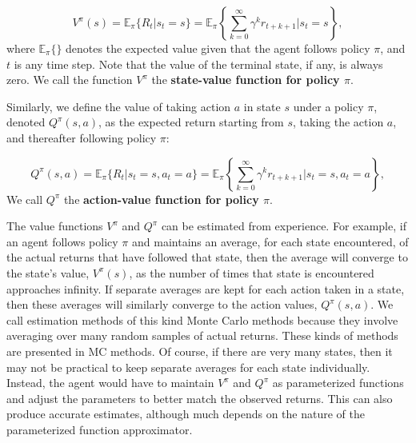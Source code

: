 \begin{equation}\label{rl-policy-state-value}
V^\pi(s) = \mathbb{E}_\pi\{R_t|s_t = s\} = 
\mathbb{E}_\pi\left\{ \sum_{k=0}^\infty\gamma^k r_{t+k+1} | s_t = s \right\},
\end{equation}
where $\mathbb{E}_\pi\{ \}$ denotes the expected value given that the agent follows 
policy $\pi$, and $t$ is any time step. Note that the value of the terminal state, if 
any, is always zero. We call the function $V^\pi$ the {\bf state-value function for 
policy $\pi$}.

Similarly, we define the value of taking action $a$ in state $s$ under a policy $\pi$, 
denoted $Q^\pi(s,a)$, as the expected return starting from $s$, taking the action $a$, 
and thereafter following policy $\pi$:

\begin{equation}\label{rl-policy-action-value}
Q^\pi(s, a) = \mathbb{E}_\pi\{R_t|s_t = s, a_t = a\} = 
\mathbb{E}_\pi\left\{ \sum_{k=0}^\infty\gamma^k r_{t+k+1} | s_t = s, a_t = a \right\},
\end{equation}
We call $Q^\pi$ the {\bf action-value function for policy $\pi$}.

The value functions $V^\pi$ and $Q^\pi$ can be estimated from experience. For example, 
if an agent follows policy $\pi$ and maintains an average, for each state encountered, 
of the actual returns that have followed that state, then the average will converge to 
the state's value, $V^\pi(s)$, as the number of times that state is encountered 
approaches infinity. If separate averages are kept for each action taken in a state, 
then these averages will similarly converge to the action values, $Q^\pi(s,a)$. We call 
estimation methods of this kind Monte Carlo methods because they involve averaging over 
many random samples of actual returns. These kinds of methods are presented in MC methods. 
Of course, if there are very many states, then it may not be practical to keep separate 
averages for each state individually. Instead, the agent would have to maintain $V^\pi$ 
and $Q^\pi$ as parameterized functions and adjust the parameters to better match the 
observed returns. This can also produce accurate estimates, although much depends on 
the nature of the parameterized function approximator.

